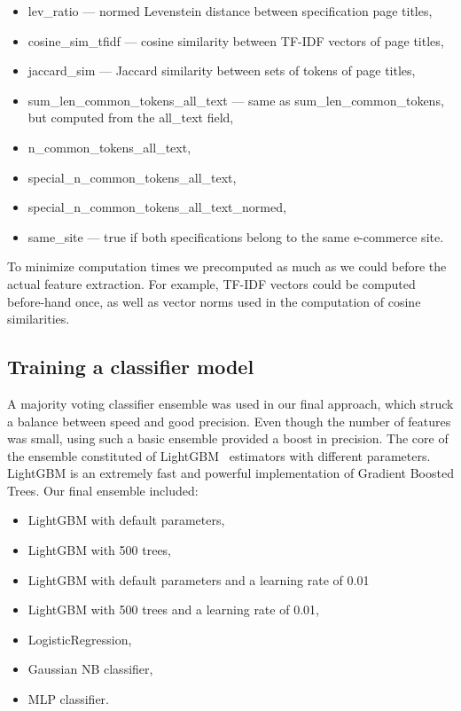 \documentclass[sigconf]{acmart}
\begin{document}
\begin{itemize}
\item lev\_ratio — normed Levenstein distance between specification page titles,

\item cosine\_sim\_tfidf — cosine similarity between TF-IDF vectors of page titles,

\item jaccard\_sim — Jaccard similarity between sets of tokens of page titles,

\item sum\_len\_common\_tokens\_all\_text — same as sum\_len\_common\_tokens, but computed from the all\_text field,
\item n\_common\_tokens\_all\_text,
\item special\_n\_common\_tokens\_all\_text,
\item special\_n\_common\_tokens\_all\_text\_normed,

\item same\_site — true if both specifications belong to the same e-commerce site.
\end{itemize} 

To minimize computation times we precomputed as much as we could before the actual feature extraction. For example, TF-IDF vectors could be computed before-hand once, as well as vector norms used in the computation of cosine similarities.

\subsection{Training a classifier model}

A majority voting classifier ensemble was used in our final approach, which struck a balance between speed and good precision. Even though the number of features was small, using such a basic ensemble provided a boost in precision. The core of the ensemble constituted of LightGBM~\cite{lightgbm} estimators with different parameters. LightGBM is an extremely fast and powerful implementation of Gradient Boosted Trees.
Our final ensemble included:
\begin{itemize}
\item LightGBM with default parameters,
\item LightGBM with 500 trees,
\item LightGBM with default parameters and a learning rate of 0.01
\item LightGBM with 500 trees and a learning rate of 0.01,
\item LogisticRegression,
\item Gaussian NB classifier,
\item MLP classifier.
\end{itemize}
\end{document}
